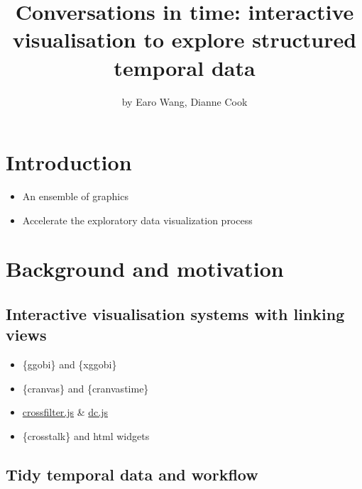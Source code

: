 \title{Conversations in time: interactive visualisation to explore structured
temporal data}
\author{by Earo Wang, Dianne Cook}

\maketitle


\hypertarget{introduction}{%
\section{Introduction}\label{introduction}}

\begin{itemize}
\tightlist
\item
  An ensemble of graphics
\item
  Accelerate the exploratory data visualization process
\end{itemize}

\hypertarget{background-and-motivation}{%
\section{Background and motivation}\label{background-and-motivation}}

\hypertarget{interactive-visualisation-systems-with-linking-views}{%
\subsection{Interactive visualisation systems with linking
views}\label{interactive-visualisation-systems-with-linking-views}}

\begin{itemize}
\tightlist
\item
  \{ggobi\} and \{xggobi\}
\item
  \{cranvas\} and \{cranvastime\}
\item
  \href{http://crossfilter.github.io/crossfilter/}{crossfilter.js} \&
  \href{https://dc-js.github.io/dc.js/}{dc.js}
\item
  \{crosstalk\} and html widgets
\end{itemize}

\hypertarget{tidy-temporal-data-and-workflow}{%
\subsection{Tidy temporal data and
workflow}\label{tidy-temporal-data-and-workflow}}

